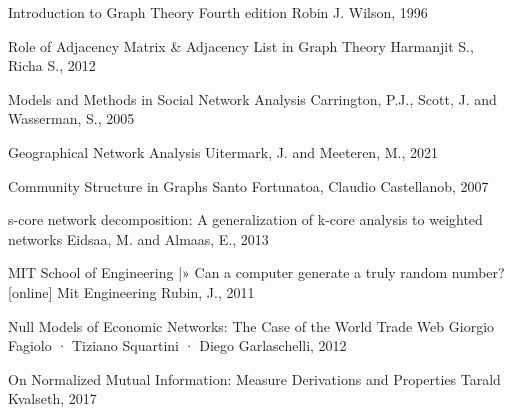 \documentclass[12pt]{article}
\begin{document}
\begin{thebibliography}{100}
   	{Introduction to Graph Theory Fourth edition }
    Robin J. Wilson,
    1996
    
    {Role of Adjacency Matrix & Adjacency List in Graph Theory}
    Harmanjit S., Richa S.,
    2012
        
    {Models and Methods in Social Network Analysis}
    Carrington, P.J., Scott, J. and Wasserman, S.,
    2005
    
    {Geographical Network Analysis}
    Uitermark, J. and Meeteren, M.,
    2021
    
    {Community Structure in Graphs}
    Santo Fortunatoa, Claudio Castellanob,
    2007
    
    {s-core network decomposition: A generalization of k-core analysis to weighted networks}
    Eidsaa, M. and Almaas, E.,
    2013
    
    {MIT School of Engineering |» Can a computer generate a truly random number? [online] Mit Engineering}
    Rubin, J.,
    2011
    
    {Null Models of Economic Networks: The Case of the World Trade Web}
    Giorgio Fagiolo · Tiziano Squartini · Diego Garlaschelli,
    2012
    
    {On Normalized Mutual Information: Measure Derivations and Properties}
    Tarald Kvalseth,
    2017
    
\end{thebibliography}
\end{document}
